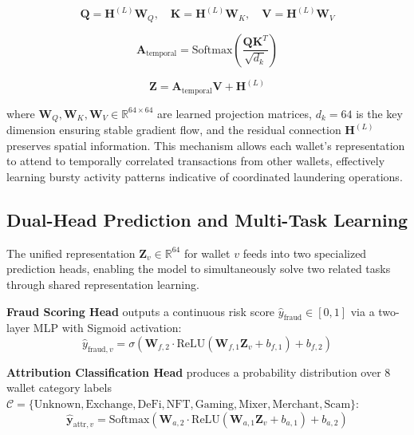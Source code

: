 \documentclass[conference]{IEEEtran}
\begin{document}
\begin{equation}
\mathbf{Q} = \mathbf{H}^{(L)} \mathbf{W}_Q, \quad \mathbf{K} = \mathbf{H}^{(L)} \mathbf{W}_K, \quad \mathbf{V} = \mathbf{H}^{(L)} \mathbf{W}_V
\label{eq:qkv}
\end{equation}

\begin{equation}
\mathbf{A}_{\text{temporal}} = \text{Softmax}\left(\frac{\mathbf{Q} \mathbf{K}^T}{\sqrt{d_k}}\right)
\label{eq:attn_weights}
\end{equation}

\begin{equation}
\mathbf{Z} = \mathbf{A}_{\text{temporal}} \mathbf{V} + \mathbf{H}^{(L)}
\label{eq:attention}
\end{equation}

where $\mathbf{W}_Q, \mathbf{W}_K, \mathbf{W}_V \in \mathbb{R}^{64 \times 64}$ are learned projection matrices, $d_k = 64$ is the key dimension ensuring stable gradient flow, and the residual connection $\mathbf{H}^{(L)}$ preserves spatial information. This mechanism allows each wallet's representation to attend to temporally correlated transactions from other wallets, effectively learning bursty activity patterns indicative of coordinated laundering operations.

\subsection{Dual-Head Prediction and Multi-Task Learning}
The unified representation $\mathbf{Z}_v \in \mathbb{R}^{64}$ for wallet $v$ feeds into two specialized prediction heads, enabling the model to simultaneously solve two related tasks through shared representation learning.

\textbf{Fraud Scoring Head} outputs a continuous risk score $\hat{y}_{\text{fraud}} \in [0,1]$ via a two-layer MLP with Sigmoid activation:
\begin{equation}
\hat{y}_{\text{fraud},v} = \sigma\left(\mathbf{W}_{f,2} \cdot \text{ReLU}(\mathbf{W}_{f,1} \mathbf{Z}_v + b_{f,1}) + b_{f,2}\right)
\label{eq:fraud}
\end{equation}

\textbf{Attribution Classification Head} produces a probability distribution over 8 wallet category labels $\mathcal{C} = \{\text{Unknown}, \text{Exchange}, \text{DeFi}, \text{NFT}, \text{Gaming}, \text{Mixer}, \text{Merchant}, \text{Scam}\}$:
\begin{equation}
\hat{\mathbf{y}}_{\text{attr},v} = \text{Softmax}\left(\mathbf{W}_{a,2} \cdot \text{ReLU}(\mathbf{W}_{a,1} \mathbf{Z}_v + b_{a,1}) + b_{a,2}\right)
\label{eq:attr}
\end{equation}
\end{document}

